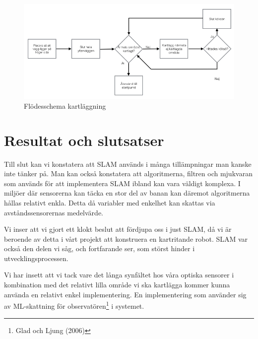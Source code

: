 \documentclass[a4paper,12pt,fleqn]{article}
\begin{document}
\begin{figure}[htp] %
  \begin{center}
  \includegraphics[keepaspectratio=true,scale=0.5]{../../Designspec/Flode_kartritning.jpg}  %
  \end{center}
  \caption{Flödesschema kartläggning} %
  \label{fig:fire} %
\end{figure}

\newpage
\section{Resultat och slutsatser}

Till slut kan vi konstatera att SLAM används i många tillämpningar man kanske inte tänker på. Man kan också konstatera att algoritmerna, filtren och mjukvaran som används för att implementera SLAM ibland kan vara väldigt komplexa. I miljöer där sensorerna kan täcka en stor del av banan kan däremot algoritmerna hållas relativt enkla. Detta då variabler med enkelhet kan skattas via avståndssensorernas medelvärde. 

Vi inser att vi gjort ett klokt beslut att fördjupa oss i just SLAM, då vi är beroende av detta i vårt projekt att konstruera en kartritande robot. SLAM var också den delen vi såg, och fortfarande ser, som störst hinder i utvecklingsprocessen. 

Vi har insett att vi tack vare det långa synfältet hos våra optiska sensorer i kombination med det relativt lilla område vi ska kartlägga kommer kunna använda en relativt enkel implementering. En implementering som använder sig av ML-skattning för observatören\footnote{Glad och Ljung (2006)} i systemet. 
\end{document}
